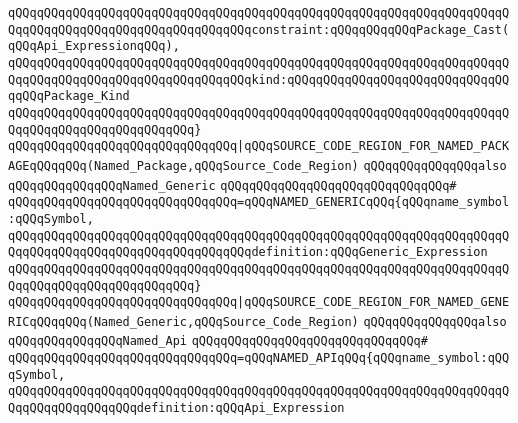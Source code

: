 \verb|qQQqqQQqqQQqqQQqqQQqqQQqqQQqqQQqqQQqqQQqqQQqqQQqqQQqqQQqqQQqqQQqqQQqqQQqqQQqqQQqqQQqqQQqqQQqqQQqqQQqqQQqconstraint:qQQqqQQqqQQqPackage_Cast(qQQqApi_ExpressionqQQq),|\newline
\verb|qQQqqQQqqQQqqQQqqQQqqQQqqQQqqQQqqQQqqQQqqQQqqQQqqQQqqQQqqQQqqQQqqQQqqQQqqQQqqQQqqQQqqQQqqQQqqQQqqQQqqQQqkind:qQQqqQQqqQQqqQQqqQQqqQQqqQQqqQQqqQQqPackage_Kind|\newline
\verb|qQQqqQQqqQQqqQQqqQQqqQQqqQQqqQQqqQQqqQQqqQQqqQQqqQQqqQQqqQQqqQQqqQQqqQQqqQQqqQQqqQQqqQQqqQQqqQQq}|\newline
\newline
\verb|qQQqqQQqqQQqqQQqqQQqqQQqqQQqqQQq|\verb#|qQQqSOURCE_CODE_REGION_FOR_NAMED_PACKAGEqQQqqQQq(Named_Package,qQQqSource_Code_Region)#\newline
\newline
\newline
\newline
\verb|qQQqqQQqqQQqqQQqalso|\newline
\verb|qQQqqQQqqQQqqQQqNamed_Generic|\newline
\verb|qQQqqQQqqQQqqQQqqQQqqQQqqQQqqQQq#|\newline
\verb|qQQqqQQqqQQqqQQqqQQqqQQqqQQqqQQq=qQQqNAMED_GENERICqQQq{qQQqname_symbol:qQQqSymbol,|\newline
\verb|qQQqqQQqqQQqqQQqqQQqqQQqqQQqqQQqqQQqqQQqqQQqqQQqqQQqqQQqqQQqqQQqqQQqqQQqqQQqqQQqqQQqqQQqqQQqqQQqqQQqqQQqdefinition:qQQqGeneric_Expression|\newline
\verb|qQQqqQQqqQQqqQQqqQQqqQQqqQQqqQQqqQQqqQQqqQQqqQQqqQQqqQQqqQQqqQQqqQQqqQQqqQQqqQQqqQQqqQQqqQQqqQQq}|\newline
\newline
\verb|qQQqqQQqqQQqqQQqqQQqqQQqqQQqqQQq|\verb#|qQQqSOURCE_CODE_REGION_FOR_NAMED_GENERICqQQqqQQq(Named_Generic,qQQqSource_Code_Region)#\newline
\newline
\newline
\newline
\verb|qQQqqQQqqQQqqQQqalso|\newline
\verb|qQQqqQQqqQQqqQQqNamed_Api|\newline
\verb|qQQqqQQqqQQqqQQqqQQqqQQqqQQqqQQq#|\newline
\verb|qQQqqQQqqQQqqQQqqQQqqQQqqQQqqQQq=qQQqNAMED_APIqQQq{qQQqname_symbol:qQQqSymbol,|\newline
\verb|qQQqqQQqqQQqqQQqqQQqqQQqqQQqqQQqqQQqqQQqqQQqqQQqqQQqqQQqqQQqqQQqqQQqqQQqqQQqqQQqqQQqqQQqdefinition:qQQqApi_Expression|\newline
